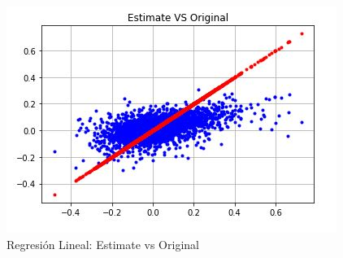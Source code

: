 \begin{figure}[h!]
	\centering
	\includegraphics[width=0.8\linewidth]{Figure/RegresionLineal_Results.JPG}
	\caption{Regresi\'on Lineal: Estimate vs Original} 
	\label{fig:LinearRegresionKernel_Results}
\end{figure}
\\

\newpage
